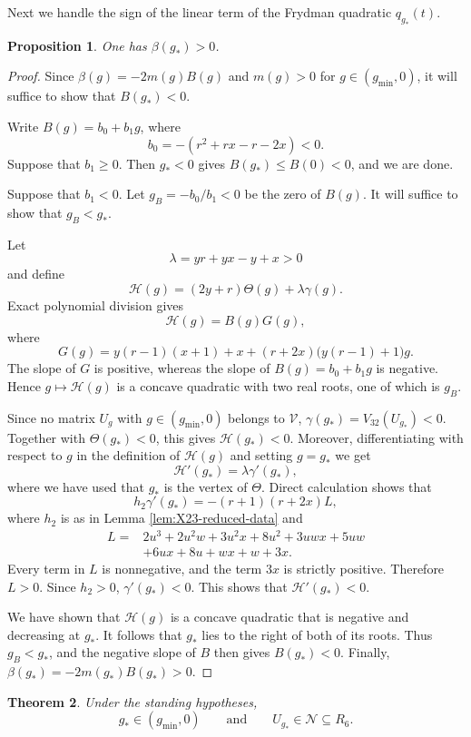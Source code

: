 \documentclass[11pt,onecolumn]{amsart}
\theoremstyle{plain}
\newtheorem{theorem}{Theorem}[section]
\newtheorem{proposition}[theorem]{Proposition}
\theoremstyle{definition}
\theoremstyle{remark}
\newcommand{\V}{\mathcal V}
\newcommand{\NH}{\mathcal N}
\begin{document}
Next we handle the sign of the linear term of the Frydman quadratic $q_{g_*}(t)$.

\begin{proposition}
\label{prop:B-tangency-order}
One has $\beta(g_*)>0$.
\end{proposition}

\begin{proof}
Since $\beta(g)=-2m(g)B(g)$ and $m(g)>0$ for $g\in (g_{\min},0)$,
it will suffice to show that $B(g_*)<0$.

	
Write $B(g)=b_0+b_1g$, where
\[
b_0=-(r^2+rx-r-2x)<0.
\]
Suppose that $b_1\geq0$. Then $g_*<0$ gives
$B(g_*)\leq B(0)<0$, and we are done.  

Suppose that $b_1<0$. Let $g_B=-b_0/b_1<0$ be  the zero of $B(g)$. It will suffice to show that $g_B<g_*$.


Let
\[
\lambda=yr+yx-y+x>0
\]
and define
\[
\mathcal H(g)=(2y+r)\Theta(g)+\lambda\gamma(g).
\]
Exact polynomial division gives
\[
\mathcal H(g)=B(g)G(g),
\]
where
\[
G(g)=y(r-1)(x+1)+x
 +(r+2x)\bigl(y(r-1)+1\bigr)g.
\]
The slope of $G$ is positive, whereas the slope of $B(g)=b_0+b_1g$ is
negative.  Hence $g\mapsto \mathcal H(g)$ is a concave quadratic with two real roots, one of which is $g_B$.

Since no matrix $U_g$ with $g\in(g_{\min},0)$ belongs to $\V$,
$\gamma(g_*)=V_{32}(U_{g_*})<0$.  Together with
$\Theta(g_*)<0$, this gives $\mathcal H(g_*)<0$.  Moreover, 
differentiating with respect to $g$ in 
the definition of $\mathcal H(g)$ and setting $g=g_*$ we get
\[
\mathcal H'(g_*)=\lambda\gamma'(g_*),
\]
where we have used that  $g_*$ is the vertex of $\Theta$.  Direct calculation shows that
\[
h_2\gamma'(g_*)=-(r+1)(r+2x)L,
\]
where $h_2$ is as in Lemma \ref{lem:X23-reduced-data} and
\[
\begin{aligned}
	L={}&2u^3+2u^2w+3u^2x+8u^2+3uwx+5uw\\
	&+6ux+8u+wx+w+3x.
\end{aligned}
\]
Every term in $L$ is nonnegative, and the term $3x$ is strictly
positive. Therefore $L>0$. Since $h_2>0$, $\gamma'(g_*)<0$. This shows that 
$\mathcal H'(g_*)<0$.

We have shown that $\mathcal H(g)$ is a concave quadratic
that is negative and decreasing at $g_*$. It follows that $g_*$ lies to the right of both
of its roots.  Thus $g_B<g_*$, and the negative slope of $B$
then gives $B(g_*)<0$.  Finally,
$\beta(g_*)=-2m(g_*)B(g_*)>0$.
\end{proof}

\begin{theorem}
\label{thm:hard-cell-predecessor}
Under the standing hypotheses,
\[
g_*\in(g_{\min},0)
\qquad\text{and}\qquad
U_{g_*}\in\NH\subseteq R_6.
\]
\end{theorem}
\end{document}
